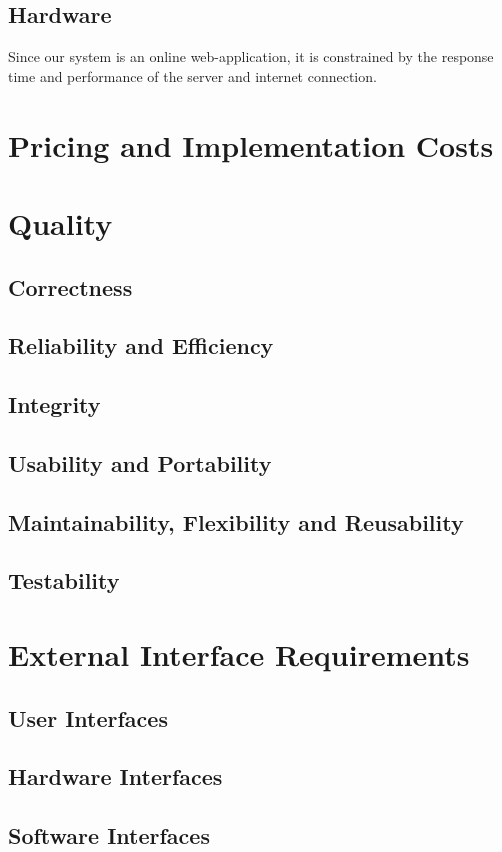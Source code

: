 \documentclass[12pt]{article}
\begin{document}
\subsection{Hardware}
Since our system is an online web-application, it is constrained by the response time and
performance of the server and internet connection.


\section{Pricing and Implementation Costs}


\section{Quality}
\subsection{Correctness}

\subsection{Reliability and Efficiency}

\subsection{Integrity}

\subsection{Usability and Portability}

\subsection{Maintainability, Flexibility and Reusability}

\subsection{Testability}


\section{External Interface Requirements}
\subsection{User Interfaces}

\subsection{Hardware Interfaces}

\subsection{Software Interfaces}
\end{document}
